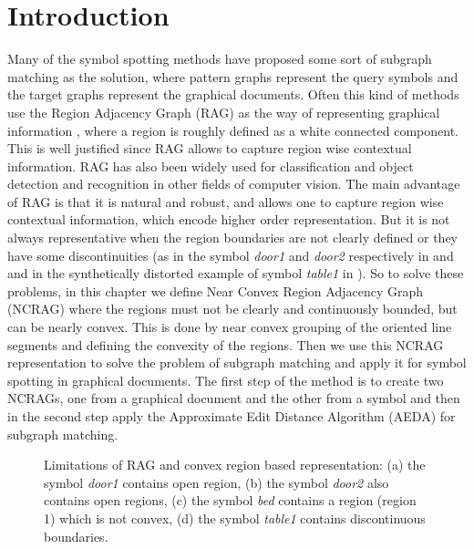 \section{Introduction}
\label{sec:ncrag:intro}
Many of the symbol spotting methods have proposed some sort of subgraph matching as the solution, where pattern graphs represent the query symbols and the target graphs represent the graphical documents. Often this kind of methods use the Region Adjacency Graph (RAG) as the way of representing graphical information \cite{LladosPAMI2001,LeBodic2012,Barducci2012}, where a region is roughly defined as a white connected component. This is well justified since RAG allows to capture region wise contextual information. RAG has also been widely used for classification \cite{Harchaoui2007} and object detection and recognition \cite{Suk1984,Jacobs1989} in other fields of computer vision. The main advantage of RAG is that it is natural and robust, and allows one to capture region wise contextual information, which encode higher order representation. But it is not always representative when the region boundaries are not clearly defined or they have some discontinuities (as in the symbol \textit{door1} and \textit{door2} respectively in  and  and in the synthetically distorted example of symbol \textit{table1} in ). So to solve these problems, in this chapter we define Near Convex Region Adjacency Graph (NCRAG) where the regions must not be clearly and continuously bounded, but can be nearly convex. This is done by near convex grouping of the oriented line segments and defining the convexity of the regions. Then we use this NCRAG representation to solve the problem of subgraph matching and apply it for symbol spotting in graphical documents. The first step of the method is to create two NCRAGs, one from a graphical document and the other from a symbol and then in the second step apply the Approximate Edit Distance Algorithm (AEDA) for subgraph matching.
\begin{figure}[!h]
\centering
{}
\hspace{0.1cm}  
\hspace{0.1cm}
\hspace{0.1cm}
\caption{Limitations of RAG and convex region based representation: (a) the symbol \textit{door1} contains open region, (b) the symbol \textit{door2} also contains open regions, (c) the symbol \textit{bed} contains a region (region 1) which is not convex, (d) the symbol \textit{table1} contains discontinuous boundaries.}
\label{fig:ncrag:rag-limit}
\end{figure}

